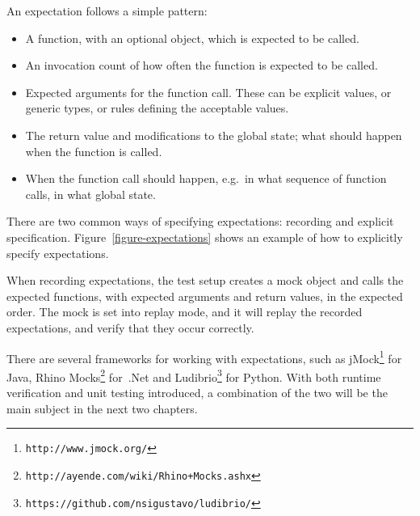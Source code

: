 An expectation follows a simple pattern:

\begin{itemize}
	\item A function, with an optional object, which is expected to be called.
	\item An invocation count of how often the function is expected to be called.
	\item Expected arguments for the function call. These can be explicit values,
		or generic types, or rules defining the acceptable values.
	\item The return value and modifications to the global state; what should
		happen when the function is called.
	\item When the function call should happen, e.g.\ in what sequence of
		function calls, in what global state.
\end{itemize}

There are two common ways of specifying expectations: recording and explicit
specification. Figure~\ref{figure-expectations} shows an example of how to
explicitly specify expectations.

When recording expectations, the test setup creates a mock object and calls the
expected functions, with expected arguments and return values, in the expected
order. The mock is set into replay mode, and it will replay the recorded
expectations, and verify that they occur correctly.

There are several frameworks for working with expectations, such as
jMock\footnote{\texttt{http://www.jmock.org/}} for Java, Rhino
Mocks\footnote{\texttt{http://ayende.com/wiki/Rhino+Mocks.ashx}} for~.Net and
Ludibrio\footnote{\texttt{https://github.com/nsigustavo/ludibrio/}} for Python.
With both runtime verification and unit testing introduced, a combination of
the two will be the main subject in the next two chapters.

